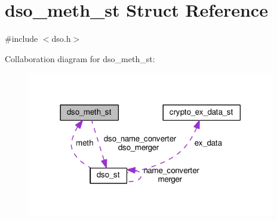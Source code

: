 \hypertarget{structdso__meth__st}{}\section{dso\+\_\+meth\+\_\+st Struct Reference}
\label{structdso__meth__st}


{\ttfamily \#include $<$dso.\+h$>$}



Collaboration diagram for dso\+\_\+meth\+\_\+st\+:
\nopagebreak
\begin{figure}[H]
\begin{center}
\leavevmode
\includegraphics[width=306pt]{structdso__meth__st__coll__graph}
\end{center}
\end{figure}
